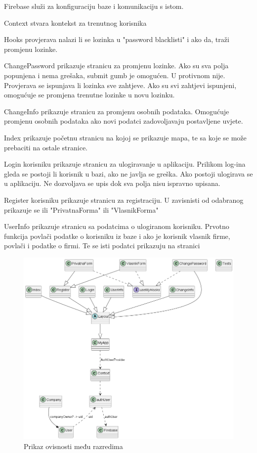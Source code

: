 	        Firebase služi za konfiguraciju baze i komunikaciju s istom. 
	        
	        Context stvara kontekst za trenutnog korisnika
	        
	        Hooks provjerava nalazi li se lozinka u "password blacklisti" i ako da, traži promjenu lozinke.

             ChangePassword prikazuje stranicu za promjenu lozinke. Ako su sva polja popunjena i nema grešaka, submit gumb je omogućen. U protivnom nije. Provjerava se ispunjava li lozinka sve zahtjeve. Ako su svi zahtjevi ispunjeni, omogućuje se promjena trenutne lozinke u novu lozinku.
    
             ChangeInfo prikazuje stranicu za promjenu osobnih podataka. Omogućuje promjenu osobnih podataka ako novi podatci zadovoljavaju postavljene uvjete. 

            Index prikazuje početnu stranicu na kojoj se prikazuje mapa, te sa koje se može prebaciti na ostale stranice.
            
	        Login korisniku prikazuje stranicu za ulogiravanje u aplikaciju. Prilikom log-ina gleda se postoji li korisnik u bazi, ako ne javlja se greška. Ako postoji ulogirava se u aplikaciju. Ne dozvoljava se upis dok sva polja nisu ispravno upisana.
	        
	        Register korisniku prikazuje stranicu za registraciju. U zavisnisti od odabranog prikazuje se ili "PrivatnaForma" ili "VlasnikForma"
	        
	        UserInfo prikazuje stranicu sa podatcima o ulogiranom korisniku. Prvotno funkcija povlači podatke o korisniku iz baze i ako je korisnik vlasnik firme, povlači i podatke o firmi. Te se isti podatci prikazuju na stranici

            
         
	        \begin{figure}[H]
			\includegraphics[scale=0.6]{slike/DijagramRazreda_veze.png}
			\centering
			\caption{Prikaz ovisnosti među razredima}
			\label{fig:promjene}
		          \end{figure}

